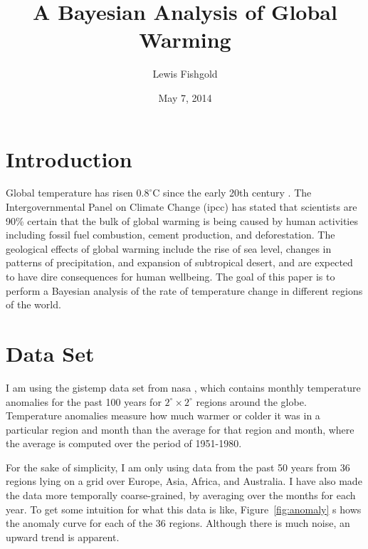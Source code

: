 \documentclass{article}
\begin{document}
\title{A Bayesian Analysis of Global Warming}
\author{Lewis Fishgold}
\date{May 7, 2014}
\maketitle

\section{Introduction}

Global temperature has risen $0.8^\circ$C since the early 20th century \cite{wiki:warming}.
The Intergovernmental Panel on Climate Change ({\sc ipcc}) has stated that
scientists are 90\% certain that the bulk of global warming 
is being caused by human activities including fossil fuel combustion,
cement production, and deforestation.
The geological effects of global warming include the rise of sea level,
changes in patterns of precipitation, and 
expansion of subtropical desert, 
and are expected to have dire consequences for human wellbeing.
The goal of this paper is to perform a Bayesian analysis of the rate
of temperature change in different regions of the world.

\section{Data Set}
I am using the {\sc gistemp} data set 
from {\sc nasa} \cite{hansen2010global}, which contains monthly temperature anomalies for 
the past 100 years for $2^\circ \times 2^\circ$ regions around the globe.
Temperature anomalies measure how much warmer or colder it was in a
particular region and month than the 
average for that region and month, where the average is computed over the period of 1951-1980.

For the sake of simplicity, I am only using data from the past 50 years from 36 regions
lying on a grid over Europe, Asia, Africa, and Australia.
I have also made the data more temporally coarse-grained, by averaging over the months
for each year.
 To get some intuition for what this data is like, Figure~\ref{fig:anomaly} s
 hows the anomaly curve for each of the 36 regions.
Although there is much noise, an upward trend is apparent.
\end{document}
